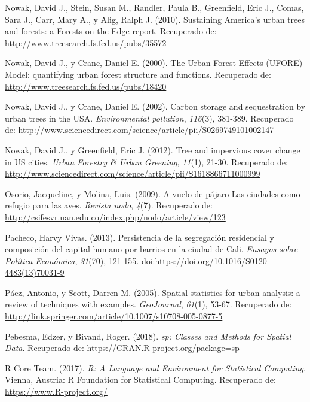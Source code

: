 \documentclass[12pt,a4paper,openany]{book}
\theoremstyle{definition}
\theoremstyle{definition}
\theoremstyle{definition}
\theoremstyle{remark}
\begin{document}
\hypertarget{ref-nowak_sustaining_2010}{}
Nowak, David J., Stein, Susan M., Randler, Paula B., Greenfield, Eric
J., Comas, Sara J., Carr, Mary A., y Alig, Ralph J. (2010). Sustaining
America's urban trees and forests: a Forests on the Edge report.
Recuperado de: \url{http://www.treesearch.fs.fed.us/pubs/35572}

\hypertarget{ref-nowak_urban_2000}{}
Nowak, David J., y Crane, Daniel E. (2000). The Urban Forest Effects
(UFORE) Model: quantifying urban forest structure and functions.
Recuperado de: \url{http://www.treesearch.fs.fed.us/pubs/18420}

\hypertarget{ref-nowak_carbon_2002}{}
Nowak, David J., y Crane, Daniel E. (2002). Carbon storage and
sequestration by urban trees in the USA. \emph{Environmental pollution},
\emph{116}(3), 381-389. Recuperado de:
\url{http://www.sciencedirect.com/science/article/pii/S0269749101002147}

\hypertarget{ref-nowak_tree_2012}{}
Nowak, David J., y Greenfield, Eric J. (2012). Tree and impervious cover
change in US cities. \emph{Urban Forestry \& Urban Greening},
\emph{11}(1), 21-30. Recuperado de:
\url{http://www.sciencedirect.com/science/article/pii/S1618866711000999}

\hypertarget{ref-osorio_vuelo_2009}{}
Osorio, Jacqueline, y Molina, Luis. (2009). A vuelo de pájaro Las
ciudades como refugio para las aves. \emph{Revista nodo}, \emph{4}(7).
Recuperado de:
\url{http://csifesvr.uan.edu.co/index.php/nodo/article/view/123}

\hypertarget{ref-PACHECO2013121}{}
Pacheco, Harvy Vivas. (2013). Persistencia de la segregación residencial
y composición del capital humano por barrios en la ciudad de Cali.
\emph{Ensayos sobre Política Económica}, \emph{31}(70), 121-155.
doi:\href{https://doi.org/https://doi.org/10.1016/S0120-4483(13)70031-9}{https://doi.org/10.1016/S0120-4483(13)70031-9}

\hypertarget{ref-paez_spatial_2005}{}
Páez, Antonio, y Scott, Darren M. (2005). Spatial statistics for urban
analysis: a review of techniques with examples. \emph{GeoJournal},
\emph{61}(1), 53-67. Recuperado de:
\url{http://link.springer.com/article/10.1007/s10708-005-0877-5}

\hypertarget{ref-R-sp}{}
Pebesma, Edzer, y Bivand, Roger. (2018). \emph{sp: Classes and Methods
for Spatial Data}. Recuperado de:
\url{https://CRAN.R-project.org/package=sp}

\hypertarget{ref-R-base}{}
R Core Team. (2017). \emph{R: A Language and Environment for Statistical
Computing}. Vienna, Austria: R Foundation for Statistical Computing.
Recuperado de: \url{https://www.R-project.org/}
\end{document}
